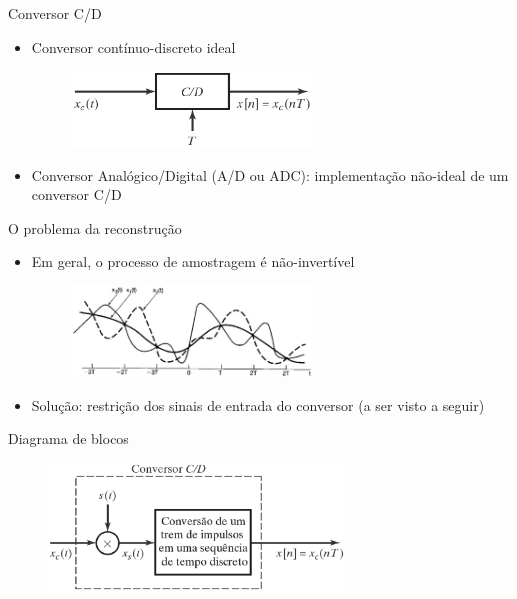 \documentclass[
size=11pt,
paper=screen,
mode=present,
display=slidesnotes,
style=paintings,
nopagebreaks,
blackslide,
fleqn]{powerdot}
\begin{document}
\begin{slide}{Conversor C/D}
\begin{itemize}
   \item Conversor cont\'inuo-discreto ideal
   \begin{figure}
      \centering
      \includegraphics[width=0.6\textwidth]{figs/cdideal2.eps}
   \end{figure}
   \item Conversor Anal\'ogico/Digital (A/D ou ADC): implementa\c c\~ao n\~ao-ideal de um conversor C/D
\end{itemize}
\end{slide}

\begin{slide}{O problema da reconstrução}
\begin{itemize}
   \item Em geral, o processo de amostragem \'e n\~ao-invert\'ivel
   \begin{figure}
      \centering
      \includegraphics[width=0.6\textwidth]{figs/ambiguo.eps}
   \end{figure}
   \item Solu\c c\~ao: restri\c c\~ao dos sinais de entrada do conversor (a ser visto a seguir)
\end{itemize}
\end{slide}

\begin{slide}{Diagrama de blocos}
   \begin{figure}
      \centering
      \includegraphics[width=0.7\textwidth]{figs/cd_implem.eps}
   \end{figure}
\end{slide}
\end{document}
